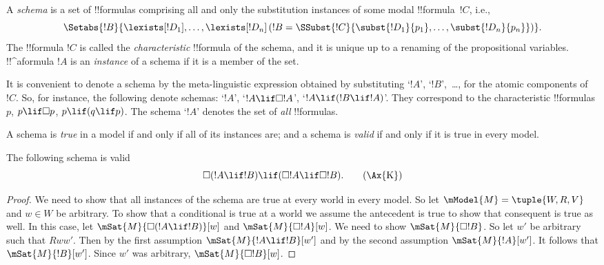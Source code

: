 \documentclass[../../../include/open-logic-section]{subfiles}
\begin{document}


\begin{defn}
  A \emph{schema} is a set of !!{formula}s comprising all
  and only the substitution instances of some modal !!{formula}~$!C$, i.e.,
  \[
  \Setabs{!B}{\lexists[!D_1], \dots, \lexists[!D_n] \left(!B =
  \SSubst{!C}{\subst{!D_1}{p_1}, \dots, \subst{!D_n}{p_n}} \right) }.
  \]
  The !!{formula} $!C$ is called the \emph{characteristic} !!{formula} of
  the schema, and it is unique up to a renaming of the propositional
  variables. !!^a{formula} $!A$ is an \emph{instance} of a schema if
  it is a member of the set.
\end{defn}

It is convenient to denote a schema by the meta-linguistic expression
obtained by substituting `$!A$', `$!B$',~\dots, for the atomic
components of~$!C$. So, for instance, the following denote schemas:
`$!A$', `$!A \lif \Box!A$', `$!A \lif (!B \lif !A)$'. They correspond
to the characteristic !!{formula}s $p$, $p \lif \Box p$, $p \lif (q
\lif p)$. The schema `$!A$' denotes the set of \emph{all}
!!{formula}s.

\begin{defn}
  A schema is \emph{true} in a model if and only if all of its instances
  are; and a schema is \emph{valid} if and only if it is true in every
  model. 
\end{defn}

\begin{prop}
  The following schema  is valid
  \begin{equation}
  \Box(!A \lif !B) \lif (\Box !A \lif \Box !B). \tag{\Ax{K}}
  \end{equation}
\end{prop}

\begin{proof}
  We need to show that all instances of the schema are true at every
  world in every model. So let $\mModel{M} = \tuple{W,R,V}$ and $w \in
  W$ be arbitrary. To show that a conditional is true at a world we
  assume the antecedent is true to show that consequent is true as
  well. In this case, let $\mSat{M}{\Box(!A \lif !B)}[w]$ and
  $\mSat{M}{\Box !A}[w]$. We need to show $\mSat{M}{\Box !B}$. So let
  $w'$ be arbitrary such that $Rww'$. Then by the first assumption
  $\mSat{M}{!A \lif !B}[w']$ and by the second assumption
  $\mSat{M}{!A}[w']$. It follows that $\mSat{M}{!B}[w']$. Since $w'$
  was arbitrary, $\mSat{M}{\Box !B}[w]$.
\end{proof}
\end{document}
